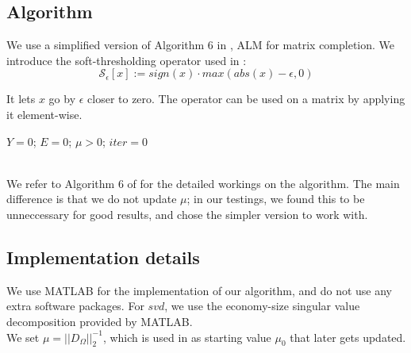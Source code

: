 \documentclass[10pt,conference,compsocconf]{IEEEtran}
\begin{document}
\subsection{Algorithm}

We use a simplified version of Algorithm 6 in \cite{almpaper}, ALM for matrix completion. We introduce the soft-thresholding operator used in \cite{almpaper}: \\

$$\mathcal{S}_{\epsilon}[x] := sign(x) \cdot max(abs(x) - \epsilon, 0)$$

It lets $x$ go by $\epsilon$ closer to zero. The operator can be used on a matrix by applying it element-wise.


\begin{algorithm}
$Y = 0$; $E = 0$; $\mu > 0$; $iter = 0$ \\
\ \\

\end{algorithm}

We refer to Algorithm 6 of \cite{almpaper} for the detailed workings on the algorithm. The main difference is
that we do not update $\mu$; in our testings, we found this to be unneccessary for good results, and chose
the simpler version to work with.

\subsection{Implementation details}

We use MATLAB for the implementation of our algorithm, and do not use any extra software packages.
For $svd$, we use the economy-size singular value decomposition provided by MATLAB. \\

We set $\mu = ||D_{\Omega}||_2^{-1}$, which is used in \cite{almpaper} as starting value $\mu_0$ that later gets updated. \\
\end{document}
